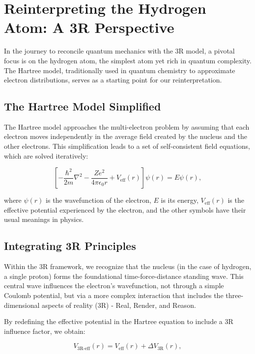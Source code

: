 \documentclass[12pt]{article}
\begin{document}
\section{Reinterpreting the Hydrogen Atom: A 3R Perspective}

In the journey to reconcile quantum mechanics with the 3R model, a pivotal focus is on the hydrogen atom, the simplest atom yet rich in quantum complexity. The Hartree model, traditionally used in quantum chemistry to approximate electron distributions, serves as a starting point for our reinterpretation.

\subsection{The Hartree Model Simplified}

The Hartree model approaches the multi-electron problem by assuming that each electron moves independently in the average field created by the nucleus and the other electrons. This simplification leads to a set of self-consistent field equations, which are solved iteratively:

\begin{equation}
    \left [ -\frac{\hbar^2}{2m}\nabla^2 - \frac{Ze^2}{4\pi\epsilon_0 r} + V_{\text{eff}}(r) \right ]\psi(r) = E\psi(r),
\end{equation}

where $\psi(r)$ is the wavefunction of the electron, $E$ is its energy, $V_{\text{eff}}(r)$ is the effective potential experienced by the electron, and the other symbols have their usual meanings in physics.

\subsection{Integrating 3R Principles}

Within the 3R framework, we recognize that the nucleus (in the case of hydrogen, a single proton) forms the foundational time-force-distance standing wave. This central wave influences the electron's wavefunction, not through a simple Coulomb potential, but via a more complex interaction that includes the three-dimensional aspects of reality (3R) - Real, Render, and Reason.

By redefining the effective potential in the Hartree equation to include a 3R influence factor, we obtain:

\begin{equation}
    V_{\text{3R-eff}}(r) = V_{\text{eff}}(r) + \Delta V_{\text{3R}}(r),
\end{equation}
\end{document}
